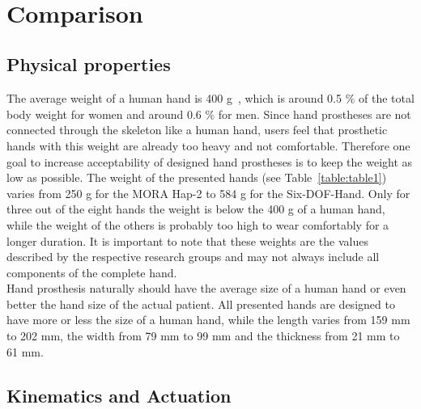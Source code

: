 \documentclass[a4paper, 10pt, conference]{ieeeconf}      %
\begin{document}
\newpage~\newpage

\section{Comparison}

\subsection{Physical properties}

The average weight of a human hand is 400 g~\cite{humanbody}, which is around 0.5 $\%$ of the total body weight for women and around 0.6 $\%$ for men. Since hand prostheses are not connected through the skeleton like a human hand, users feel that prosthetic hands with this weight are already too heavy and not comfortable. Therefore one goal to increase acceptability of designed hand prostheses is to keep the weight as low as possible. The weight of the presented hands (see Table~\ref{table:table1}) varies from 250 g for the MORA Hap-2 to 584 g for the Six-DOF-Hand. Only for three out of the eight hands the weight is below the 400 g of a human hand, while the weight of the others is probably too high to wear comfortably for a longer duration. It is important to note that these weights are the values described by the respective research groups and may not always include all components of the complete hand.\\
Hand prosthesis naturally should have the average size of a human hand or even better the hand size of the actual patient. All presented hands are designed to have more or less the size of a human hand, while the length varies from 159 mm to 202 mm, the width from 79 mm to 99 mm and the thickness from 21 mm to 61 mm.

\subsection{Kinematics and Actuation}
\end{document}

